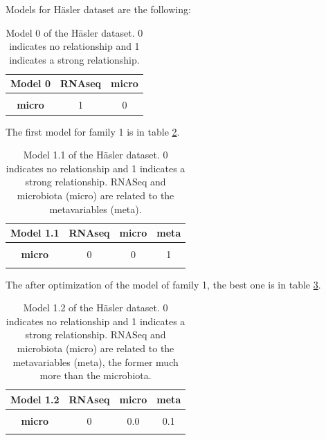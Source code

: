 \documentclass[
  12pt,
  a4paper,
  twoside,
  openright]{book}
\begin{document}
Models for Häsler dataset are the following:

\begin{table}[H]

\caption[Model 0 of the Häsler dataset.]{\label{tab:hasler-model-0}Model 0 of the Häsler dataset. 0 indicates no relationship and 1 indicates a strong relationship.}
\centering
\begin{tabular}[t]{>{}c|c|c}
\hline
\textbf{Model 0} & \textbf{RNAseq} & \textbf{micro}\\
\hline
\textbf{\cellcolor{gray!6}{RNAseq}} & \cellcolor{gray!6}{0} & \cellcolor{gray!6}{1}\\
\hline
\textbf{micro} & 1 & 0\\
\hline
\end{tabular}
\end{table}

The first model for family 1 is in table \ref{tab:hasler-model-1-1}.

\begin{table}[H]

\caption[Model 1.1 of the Häsler dataset.]{\label{tab:hasler-model-1-1}Model 1.1 of the Häsler dataset. 0 indicates no relationship and 1 indicates a strong relationship. RNASeq and microbiota (micro) are related to the metavariables (meta).}
\centering
\begin{tabular}[t]{>{}c|c|c|c}
\hline
\textbf{Model 1.1} & \textbf{RNAseq} & \textbf{micro} & \textbf{meta}\\
\hline
\textbf{\cellcolor{gray!6}{RNAseq}} & \cellcolor{gray!6}{0} & \cellcolor{gray!6}{0} & \cellcolor{gray!6}{1}\\
\hline
\textbf{micro} & 0 & 0 & 1\\
\hline
\textbf{\cellcolor{gray!6}{meta}} & \cellcolor{gray!6}{1} & \cellcolor{gray!6}{1} & \cellcolor{gray!6}{0}\\
\hline
\end{tabular}
\end{table}

The after optimization of the model of family 1, the best one is in table \ref{tab:hasler-model-1-2}.

\begin{table}[H]

\caption[Model 1.2 of the Häsler dataset.]{\label{tab:hasler-model-1-2}Model 1.2 of the Häsler dataset. 0 indicates no relationship and 1 indicates a strong relationship. RNASeq and microbiota (micro) are related to the metavariables (meta), the former much more than the microbiota.}
\centering
\begin{tabular}[t]{>{}c|c|c|c}
\hline
\textbf{Model 1.2} & \textbf{RNAseq} & \textbf{micro} & \textbf{meta}\\
\hline
\textbf{\cellcolor{gray!6}{RNAseq}} & \cellcolor{gray!6}{0} & \cellcolor{gray!6}{0.0} & \cellcolor{gray!6}{1.0}\\
\hline
\textbf{micro} & 0 & 0.0 & 0.1\\
\hline
\textbf{\cellcolor{gray!6}{meta}} & \cellcolor{gray!6}{1} & \cellcolor{gray!6}{0.1} & \cellcolor{gray!6}{0.0}\\
\hline
\end{tabular}
\end{table}
\end{document}
